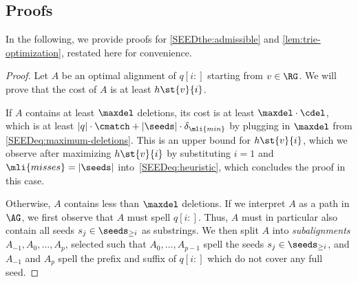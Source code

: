 \subsection{Proofs} \label{app:proof}

In the following, we provide proofs for \cref{SEEDthe:admissible} and
\cref{lem:trie-optimization}, restated here for convenience.

\admissibility*

\begin{proof}
	Let $A$ be an optimal alignment of $q[i{:}]$ starting from $v \in \RG$. We
	will prove that the cost of $A$ is at least $h\st{v}{i}$.

	If $A$ contains at least $\maxdel$ deletions, its cost is at least $\maxdel
	\cdot \cdel$, which is at least $|q| \cdot \cmatch + |\seeds| \cdot
	\delta_{\mli{min}}$ by plugging in $\maxdel$ from
	\cref{SEEDeq:maximum-deletions}. This is an upper bound for $h\st{v}{i}$, which
	we observe after maximizing $h\st{v}{i}$ by substituting $i=1$ and
	$\mli{misses}=|\seeds|$ into~\cref{SEEDeq:heuristic}, which concludes the proof
	in this case.

	Otherwise, $A$ contains less than $\maxdel$ deletions.
	If we interpret $A$ as a path in $\AG$, we first observe that $A$ must spell
	$q[i{:}]$. Thus, $A$ must in particular also contain all seeds $s_j \in
	\seeds_{\geq i}$ as substrings. We then split $A$ into \emph{subalignments}
	$A_{-1}, A_0, \dots, A_{p}$, selected such that $A_0, \dots, A_{p-1}$ spell
	the seeds $s_j \in \seeds_{\geq i}$, and $A_{-1}$ and $A_p$ spell the prefix
	and suffix of $q[i{:}]$ which do not cover any full seed.


\end{proof}

